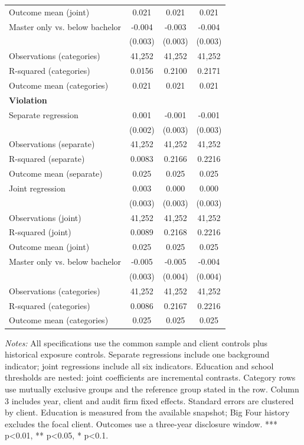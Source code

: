\begin{table}[htbp]
\begin{threeparttable}
\begin{tabular}{p{}ccc}
Outcome mean (joint) & 0.021 & 0.021 & 0.021 \\
Master only vs. below bachelor & -0.004 & -0.003 & -0.004 \\
 & (0.003) & (0.003) & (0.003) \\
Observations (categories) & 41,252 & 41,252 & 41,252 \\
R-squared (categories) & 0.0156 & 0.2100 & 0.2171 \\
Outcome mean (categories) & 0.021 & 0.021 & 0.021 \\
\multicolumn{4}{l}{\textbf{Violation}} \\
Separate regression & 0.001 & -0.001 & -0.001 \\
 & (0.002) & (0.003) & (0.003) \\
Observations (separate) & 41,252 & 41,252 & 41,252 \\
R-squared (separate) & 0.0083 & 0.2166 & 0.2216 \\
Outcome mean (separate) & 0.025 & 0.025 & 0.025 \\
Joint regression & 0.003 & 0.000 & 0.000 \\
 & (0.003) & (0.003) & (0.003) \\
Observations (joint) & 41,252 & 41,252 & 41,252 \\
R-squared (joint) & 0.0089 & 0.2168 & 0.2216 \\
Outcome mean (joint) & 0.025 & 0.025 & 0.025 \\
Master only vs. below bachelor & -0.005 & -0.005 & -0.004 \\
 & (0.003) & (0.004) & (0.004) \\
Observations (categories) & 41,252 & 41,252 & 41,252 \\
R-squared (categories) & 0.0086 & 0.2167 & 0.2216 \\
Outcome mean (categories) & 0.025 & 0.025 & 0.025 \\
\bottomrule
\end{tabular}
\begin{tablenotes}\footnotesize
\item \raggedright \textit{Notes:} All specifications use the common sample and client controls plus historical exposure controls. Separate regressions include one background indicator; joint regressions include all six indicators. Education and school thresholds are nested: joint coefficients are incremental contrasts. Category rows use mutually exclusive groups and the reference group stated in the row. Column 3 includes year, client and audit firm fixed effects. Standard errors are clustered by client. Education is measured from the available snapshot; Big Four history excludes the focal client. Outcomes use a three-year disclosure window. *** p<0.01, ** p<0.05, * p<0.1.
\end{tablenotes}
\end{threeparttable}
\end{table}
